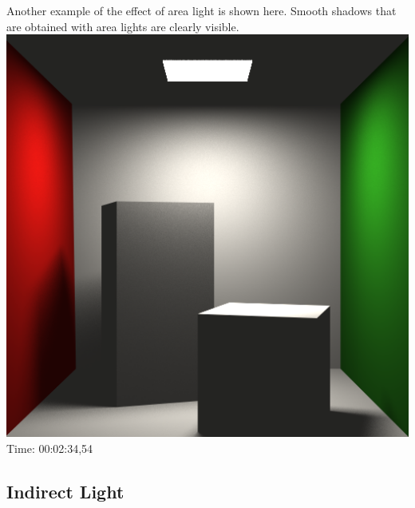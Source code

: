 \documentclass[12pt]{article} %
\begin{document}
Another example of the effect of area light is shown here. Smooth shadows that are obtained with area lights are clearly visible.\\
\includegraphics[width=\linewidth]{Homework4/tests/06_cb_direct.png}
Time: 00:02:34,54


\subsection{Indirect Light} 
\end{document}

